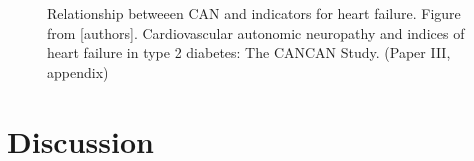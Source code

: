\documentclass[
  a4paper,
  headsepline=true,
  open=any]{scrbook}
\begin{document}
\begin{figure}

\begin{minipage}[t]{\linewidth}

{\centering 


\caption{\label{fig-CAN}Relationship betweeen CAN and indicators for
heart failure. Figure from {[}authors{]}. Cardiovascular autonomic
neuropathy and indices of heart failure in type 2 diabetes: The CANCAN
Study. (Paper III, appendix)}

}

\end{minipage}%

\end{figure}


\hypertarget{discussion}{%
\chapter{Discussion}\label{discussion}}
\end{document}
